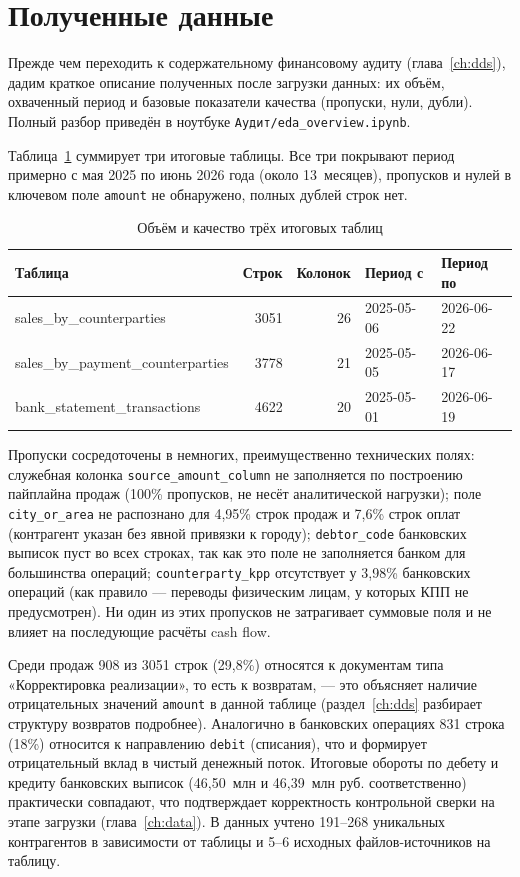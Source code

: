 \section{Полученные данные}
\label{ch:audit}

Прежде чем переходить к содержательному финансовому аудиту (глава~\ref{ch:dds}), дадим краткое описание полученных после загрузки данных: их объём, охваченный период и базовые показатели качества (пропуски, нули, дубли). Полный разбор приведён в ноутбуке \texttt{Аудит/eda\_overview.ipynb}.

Таблица~\ref{tab:eda-summary} суммирует три итоговые таблицы. Все три покрывают период примерно с мая 2025 по июнь 2026 года (около 13~месяцев), пропусков и нулей в ключевом поле \texttt{amount} не обнаружено, полных дублей строк нет.

\begin{table}[h]
\centering
\caption{Объём и качество трёх итоговых таблиц}
\label{tab:eda-summary}
\begin{tabular}{lrrll}
\hline
Таблица & Строк & Колонок & Период с & Период по \\
\hline
sales\_by\_counterparties & 3051 & 26 & 2025-05-06 & 2026-06-22 \\
sales\_by\_payment\_counterparties & 3778 & 21 & 2025-05-05 & 2026-06-17 \\
bank\_statement\_transactions & 4622 & 20 & 2025-05-01 & 2026-06-19 \\
\hline
\end{tabular}
\end{table}

Пропуски сосредоточены в немногих, преимущественно технических полях: служебная колонка \texttt{source\_amount\_column} не заполняется по построению пайплайна продаж (100\% пропусков, не несёт аналитической нагрузки); поле \texttt{city\_or\_area} не распознано для 4,95\% строк продаж и 7,6\% строк оплат (контрагент указан без явной привязки к городу); \texttt{debtor\_code} банковских выписок пуст во всех строках, так как это поле не заполняется банком для большинства операций; \texttt{counterparty\_kpp} отсутствует у 3,98\% банковских операций (как правило — переводы физическим лицам, у которых КПП не предусмотрен). Ни один из этих пропусков не затрагивает суммовые поля и не влияет на последующие расчёты cash flow.

Среди продаж 908 из 3051 строк (29,8\%) относятся к документам типа «Корректировка реализации», то есть к возвратам, --- это объясняет наличие отрицательных значений \texttt{amount} в данной таблице (раздел~\ref{ch:dds} разбирает структуру возвратов подробнее). Аналогично в банковских операциях 831 строка (18\%) относится к направлению \texttt{debit} (списания), что и формирует отрицательный вклад в чистый денежный поток. Итоговые обороты по дебету и кредиту банковских выписок (46,50~млн и 46,39~млн руб. соответственно) практически совпадают, что подтверждает корректность контрольной сверки на этапе загрузки (глава~\ref{ch:data}). В данных учтено 191--268 уникальных контрагентов в зависимости от таблицы и 5--6 исходных файлов-источников на таблицу.

